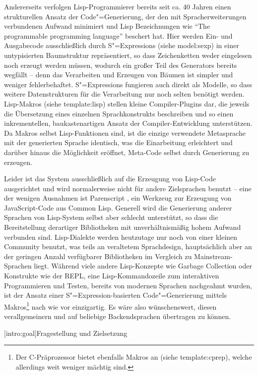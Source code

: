 \documentclass[11pt, a4paper, bibgerm]{scrbook}
\newcommand\lsection{}
\newcommand\sref{}
\newcommand{\sees}[1]{(siehe \sref{#1})}
\newcommand{\sexp}{S"=Expression}
\newcommand{\sexps}{S"=Expressions}
\newcommand{\cgen}{Code"=Generierung}
\begin{document}
Andererseits verfolgen Lisp-Programmierer bereits seit ca. 40
Jahren \cite{EvolutionOfLisp} einen strukturellen Ansatz der \cgen{}, der den
mit Spracherweiterungen verbundenen Aufwand minimiert und Lisp
Bezeichnungen wie "`The programmable programming
language"' \cite{Federano} beschert hat. Hier werden Ein- und Ausgabecode
ausschließlich durch \sexps{} \sees{model:sexp} in einer untypisierten
Baumstruktur repräsentiert, so dass Zeichenketten weder eingelesen noch
erzeugt werden müssen, wodurch ein großer Teil des Generators bereits
wegfällt -- denn das Verarbeiten und Erzeugen von Bäumen ist simpler und
weniger fehlerbehaftet. \sexps{} fungieren auch direkt als Modelle, so
dass weitere Datenstrukturen für die Verarbeitung nur noch selten
benötigt werden. Lisp-Makros \sees{template:lisp} stellen kleine
Compiler-Plugins dar, die jeweils die Übersetzung eines einzelnen
Sprachkonstrukts beschreiben und so einen inkrementellen,
baukastenartigen Ansatz der Compiler-Entwicklung unterstützen. Da Makros
selbst Lisp-Funktionen sind, ist die einzige verwendete Metasprache mit
der generierten Sprache identisch, was die Einarbeitung erleichtert und
darüber hinaus die Möglichkeit eröffnet, Meta-Code selbst durch
Generierung zu erzeugen.

Leider ist das System ausschließlich auf die Erzeugung von Lisp-Code
ausgerichtet und wird normalerweise nicht für andere Zielsprachen
benutzt -- eine der wenigen Ausnahmen ist Parenscript \cite{Parenscript},
ein Werkzeug zur Erzeugung von JavaScript-Code aus Common Lisp. Generell
wird die Generierung anderer Sprachen von Lisp-System selbst aber
schlecht unterstützt, so dass die Bereitstellung derartiger Bibliotheken
mit unverhältnismäßig hohem Aufwand verbunden sind. Lisp-Dialekte werden
heutzutage nur noch von einer kleinen Community benutzt, was teils an
veraltetem Sprachdesign, hauptsächlich aber an der geringen Anzahl
verfügbarer Bibliotheken im Vergleich zu Mainstream-Sprachen
liegt. Während viele andere Lisp-Konzepte wie Garbage Collection oder
Konstrukte wie der REPL, eine Lisp-Kommandozeile zum interaktiven
Programmieren und Testen, bereits von modernen Sprachen nachgeahmt
wurden, ist der Ansatz einer \sexp-basierten \cgen{} mittels
Makros\footnote{Der C-Präprozessor bietet ebenfalls Makros an
  \sees{template:cprep}, welche allerdings weit weniger mächtig sind.}
nach wie vor einzigartig. Es wäre also wünschenswert, diesen
verallgemeinern und auf beliebige Backendsprachen übertragen zu können.

\lsection[intro:goal]{Fragestellung und Zielsetzung}
\end{document}
